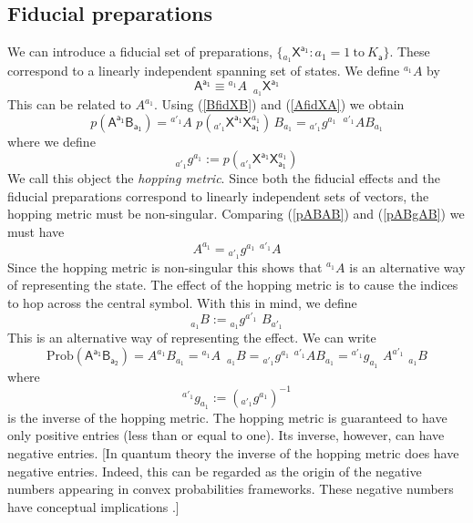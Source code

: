\documentclass[10pt]{article}
\begin{document}
\subsection{Fiducial preparations}

We can introduce a  fiducial set of preparations, $\{{}_{a_1}\!\mathsf{X}^\mathsf{a_1} : a_1=1 ~\text{to}~ K_\mathsf{a}\}$.  These correspond to a linearly independent spanning set of states.  We define ${}^{a_1}\! A$ by
\begin{equation}\label{AfidXA}
\mathsf{A^{a_1}} \equiv {}^{a_1}\!\!A \,\,\,{}_{a_1}\!\mathsf{X}^\mathsf{a_1}
\end{equation}
This can be related to $A^{a_1}$.  Using (\ref{BfidXB}) and (\ref{AfidXA}) we obtain
\begin{equation}\label{pABgAB}
p(\mathsf{A^{a_1}B_{a_1}}) =  {}^{a'_1}\!\!A  \,\, p({}_{a'_1}\!\mathsf{X}^\mathsf{a_1}\mathsf{X}_\mathsf{a_1}^{a_1}) \, B_{a_1}
= {}_{a'_1}\! g^{a_1} \,\,\, {}^{a'_1}\!\!A B_{a_1}
\end{equation}
where we define
\begin{equation}
{}_{a'_1}\! g^{a_1} := p({}_{a'_1}\!\mathsf{X}^\mathsf{a_1}\mathsf{X}_\mathsf{a_1}^{a_1})
\end{equation}
We call this object the \emph{hopping metric}.  Since both the fiducial effects and the fiducial preparations correspond to linearly independent sets of vectors, the hopping metric must be non-singular.  Comparing (\ref{pABAB}) and (\ref{pABgAB}) we must have
\begin{equation}
A^{a_1} = {}_{a'_1}\! g^{a_1} \,\,  {}^{a'_1}\! A
\end{equation}
Since the hopping metric is non-singular this shows that ${}^{a_1}\! A$ is an alternative way of representing the state.
The effect of the hopping metric is to cause the indices to hop across the central symbol.   With this in mind, we define
\begin{equation}
{}_{a_1} B := {}_{a_1}\! g^{a'_1}\,\, B_{a'_1}
\end{equation}
This is an alternative way of representing the effect.   We can write
\begin{equation}\label{probABmultiversions}
\text{Prob}(\mathsf{A^{a_1}B_{a_2}}) = A^{a_1}B_{a_1} = {}^{a_1}\! A \,\,\, {}_{a_1}\! B = {}_{a'_1}\! g^{a_1} \,\, {}^{a'_1}\!\!A B_{a_1}
=  {}^{a'_1}\! g_{a_1} \,\, A^{a'_1} \,\,{}_{a_1}\! B
\end{equation}
where
\begin{equation}
{}^{a'_1}\! g_{a_1} := \left( {}_{a'_1}\! g^{a_1} \right)^{-1}
\end{equation}
is the inverse of the hopping metric.  The hopping metric is guaranteed to have only positive entries (less than  or equal to one).  Its inverse, however, can have negative entries.  [In quantum theory the inverse of the hopping metric does have negative entries.  Indeed, this can be regarded as the origin of the negative numbers appearing in convex probabilities frameworks.  These negative numbers have conceptual implications \cite{spekkens2008negativity, ferrie2009framed}.]
\end{document}
